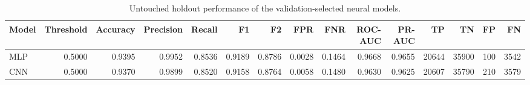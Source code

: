 \begin{table}
\caption{Untouched holdout performance of the validation-selected neural models.}
\label{tab:neural_holdout_performance}
\begin{tabular}{lrrrrrrrrrrrrrr}
\toprule
Model & Threshold & Accuracy & Precision & Recall & F1 & F2 & FPR & FNR & ROC-AUC & PR-AUC & TP & TN & FP & FN \\
\midrule
MLP & 0.5000 & 0.9395 & 0.9952 & 0.8536 & 0.9189 & 0.8786 & 0.0028 & 0.1464 & 0.9668 & 0.9655 & 20644 & 35900 & 100 & 3542 \\
CNN & 0.5000 & 0.9370 & 0.9899 & 0.8520 & 0.9158 & 0.8764 & 0.0058 & 0.1480 & 0.9630 & 0.9625 & 20607 & 35790 & 210 & 3579 \\
\bottomrule
\end{tabular}
\end{table}
